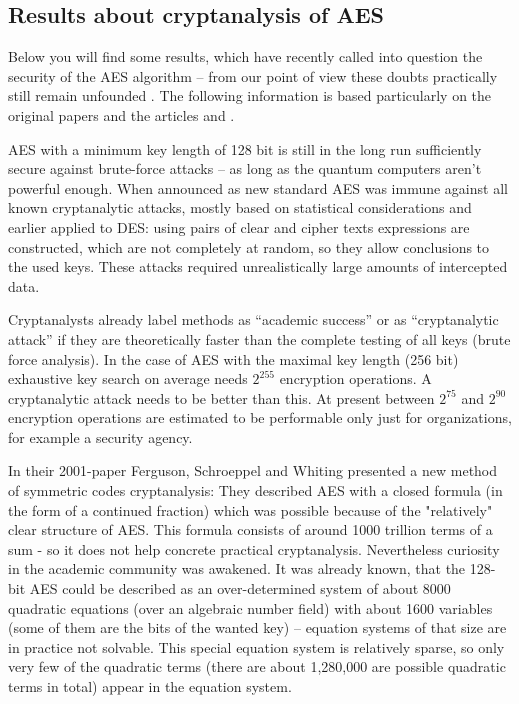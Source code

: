 \subsection{Results about cryptanalysis of AES}
\label{NeueAES-Analyse}

Below you will find some results, which have recently called into question the security of the AES algorithm -- from our point of view these doubts practically still remain unfounded
. 
The following information is based particularly on the original papers and the
articles \cite{cm:Wobst-iX2002} and \cite{cm:Lucks-DuD2002}.

AES with a minimum key length of 128 bit is still in the long run sufficiently secure against brute-force attacks -- as long as the quantum computers aren't powerful enough. When announced as new standard AES was immune against all known cryptanalytic attacks, mostly based on statistical considerations and earlier applied to DES: using pairs of clear and cipher texts expressions are constructed, which are not completely at random, so they allow conclusions to the used keys. These attacks required unrealistically large amounts of intercepted data.

Cryptanalysts already label methods as ``academic success'' or as ``cryptanalytic attack'' if they are theoretically faster than the complete testing of all keys (brute force analysis). In the case of AES with the maximal key length (256 bit) exhaustive key search on average needs $2^{255}$ encryption operations. A cryptanalytic attack needs to be better than this. At present between $2^{75}$ and $2^{90}$ encryption operations are estimated to be performable only just for organizations, for example a security agency.

In their 2001-paper Ferguson, Schroeppel and Whiting \cite{cm:Ferguson2001}
presented a new method of symmetric codes cryptanalysis: They described AES with
a closed formula (in the form of a continued fraction) which was possible
because of the "relatively" clear structure of AES. This formula consists of
around 1000 trillion terms of a sum - so it does not help concrete practical
cryptanalysis. Nevertheless curiosity in the academic community was awakened.
It was already known, that the 128-bit AES could be described as an
over-determined system of about 8000 quadratic equations (over an algebraic
number field) with about 1600 variables (some of them are the bits of the wanted
key) -- equation systems of that size are in practice not solvable. This special
equation system is relatively sparse, so only very few of the quadratic terms
(there are about 1,280,000 are possible quadratic terms in total) appear in the
equation system.


